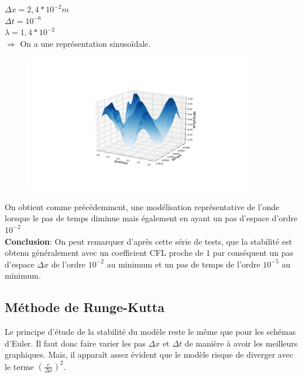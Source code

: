 \begin{enumerate}[label=\alph*)]
\begin{minipage}{.45\textwidth}%

\item $\Delta x=2,4*{10}^{-2}m$ \\
$\Delta t= {10}^{-6}$ \\
$\lambda=1,4*{10}^{-2} $\\


$\Longrightarrow$ On a une représentation sinusoïdale. 
\end{minipage}%
\hfill
\begin{minipage}{.6\textwidth}%

\includegraphics[width=12cm,height=6cm]{dt=10^-6 avec dx=0.024.png}
\end{minipage}
On obtient comme précédemment, une modélisation représentative de l'onde lorsque le pas de temps diminue mais également en ayant un pas d'espace d'ordre ${10}^{-2}$\\


\textbf{Conclusion}: On peut remarquer d'après cette série de tests, que la stabilité est obtenu généralement avec un coefficient CFL proche de 1 par conséquent un pas d'espace $\Delta x$ de l'ordre ${10}^{-2}$ au minimum et un pas de temps de l'ordre ${10}^{-5}$ au minimum.   


\end{enumerate}

\subsection{Méthode de Runge-Kutta}
Le principe d'étude de la stabilité du modèle reste le même que pour les schémas d'Euler. Il faut donc faire varier les pas $\Delta x$ et $\Delta t$ de manière à avoir les meilleurs graphiques.
Mais, il apparaît assez évident que le modèle risque de diverger avec le terme $(\frac{c}{\Delta x})^2$.\\

